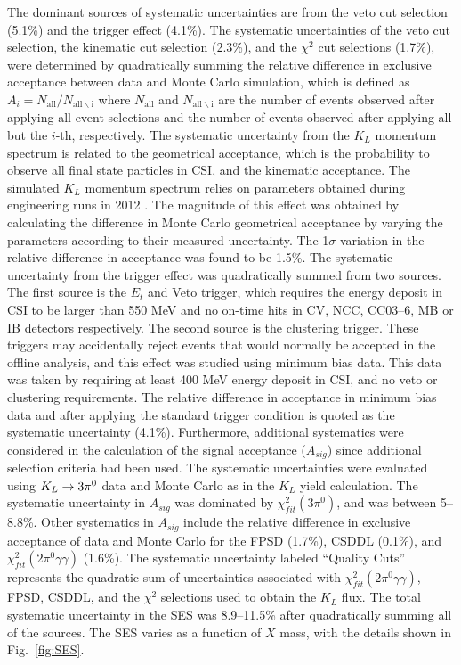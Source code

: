 \documentclass[twocolumn, superscriptaddress, aps,prl]{revtex4-2}
\begin{document}
The dominant sources of systematic uncertainties are from the veto cut selection (5.1\%) and the trigger effect (4.1\%). The systematic uncertainties of the veto cut selection, the kinematic cut selection (2.3\%), and the $\chi^2$ cut selections (1.7\%), were determined by quadratically summing the relative difference in exclusive acceptance between data and Monte Carlo simulation, which is defined as $A_i = N_{\mathrm{all}}/N_{\mathrm{all \backslash i}}$ where $N_{\mathrm{all}}$ and $N_{\mathrm{all \backslash i}}$ are the number of events observed after applying all event selections and the number of events observed after applying all but the $i$-th, respectively. The systematic uncertainty from the $K_L$ momentum spectrum is related to the geometrical acceptance, which is the probability to observe all final state particles in CSI, and the kinematic acceptance. The simulated $K_L$ momentum spectrum relies on parameters obtained during engineering runs in 2012 \cite{sato_thesis,kl_flux_momentum}. The magnitude of this effect was obtained by calculating the difference in Monte Carlo geometrical acceptance by varying the parameters according to their measured uncertainty. The 1$\sigma$ variation in the relative difference in acceptance was found to be 1.5\%. The systematic uncertainty from the trigger effect was quadratically summed from two sources. The first source is the $E_t$  and Veto trigger, which requires the energy deposit in CSI to be larger than 550 MeV and no on-time hits in CV, NCC, CC03--6, MB or IB detectors respectively. The second source is the clustering trigger. These triggers may accidentally reject events that would normally be accepted in the offline analysis, and this effect was studied using minimum bias data. This data was taken by requiring at least 400 MeV energy deposit in CSI, and no veto or clustering requirements. The relative difference in acceptance in minimum bias data and after applying the standard trigger condition is quoted as the systematic uncertainty (4.1\%). Furthermore, additional systematics were considered in the calculation of the signal acceptance ($A_{sig}$) since additional selection criteria had been used. The systematic uncertainties were evaluated using $K_L \rightarrow 3\pi^0$ data and Monte Carlo as in the $K_L$ yield calculation. The systematic uncertainty in $A_{sig}$ was dominated by $\chi^2_{fit}(3\pi^0)$, and was between 5--8.8\%. Other systematics in $A_{sig}$ include the relative difference in exclusive acceptance of data and Monte Carlo for the FPSD (1.7\%), CSDDL (0.1\%), and $\chi^2_{fit}(2\pi^0\gamma\gamma)$ (1.6\%). The systematic uncertainty labeled ``Quality Cuts'' represents the quadratic sum of uncertainties associated with $\chi^2_{fit}(2\pi^0\gamma\gamma)$, FPSD, CSDDL, and the $\chi^2$ selections used to obtain the $K_L$ flux. The total systematic uncertainty in the SES was 8.9--11.5\% after quadratically summing all of the sources. The SES varies as a function of $X$ mass, with the details shown in Fig.~\ref{fig:SES}.
\end{document}
